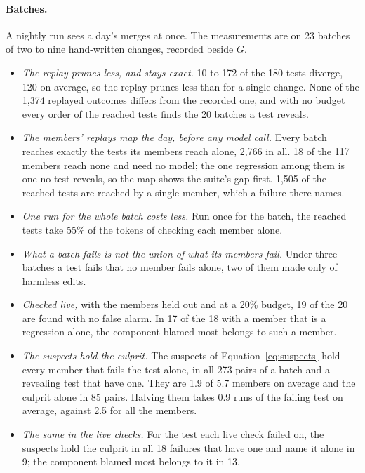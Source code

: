 \documentclass[11pt,a4paper]{article}
\begin{document}
\paragraph{Batches.} A nightly run sees a day's merges at once. The measurements are on 23 batches of two to
nine hand-written changes, recorded beside $G$.
\begin{itemize}
  \item \emph{The replay prunes less, and stays exact.} 10 to 172 of the 180 tests diverge, 120 on average, so
        the replay prunes less than for a single change. None of the 1,374 replayed outcomes differs from the
        recorded one, and with no budget every order of the reached tests finds the 20 batches a test reveals.
  \item \emph{The members' replays map the day, before any model call.} Every batch reaches exactly the tests its
        members reach alone, 2,766 in all. 18 of the 117 members reach none and need no model; the one regression
        among them is one no test reveals, so the map shows the suite's gap first. 1,505 of the reached tests are
        reached by a single member, which a failure there names.
  \item \emph{One run for the whole batch costs less.} Run once for the batch, the reached tests take 55\% of the
        tokens of checking each member alone.
  \item \emph{What a batch fails is not the union of what its members fail.} Under three batches a test fails that
        no member fails alone, two of them made only of harmless edits.
  \item \emph{Checked live,} with the members held out and at a 20\% budget, 19 of the 20 are found with no false
        alarm. In 17 of the 18 with a member that is a regression alone, the component blamed most belongs to such
        a member.
  \item \emph{The suspects hold the culprit.} The suspects of Equation~\ref{eq:suspects} hold every member that
        fails the test alone, in all 273 pairs of a batch and a revealing test that have one. They are 1.9 of 5.7
        members on average and the culprit alone in 85 pairs. Halving them takes 0.9 runs of the failing test on
        average, against 2.5 for all the members.
  \item \emph{The same in the live checks.} For the test each live check failed on, the suspects hold the culprit
        in all 18 failures that have one and name it alone in 9; the component blamed most belongs to it in 13.
\end{itemize}
\end{document}
